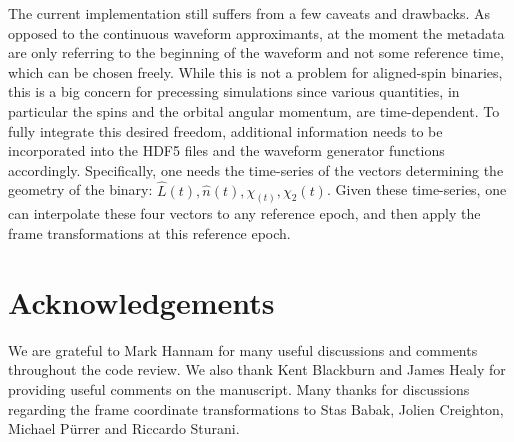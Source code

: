 \documentclass[11pt,tightenlines,article,amssymb,amsmath,amsfonts,superscriptaddress]{revtex4}
\newcommand{\nNR}{\hat{n}}
\newcommand{\lNR}{\hat L}
\begin{document}
The current implementation still suffers from a few caveats and drawbacks. As opposed to the continuous waveform approximants, at the moment the metadata are only referring to the beginning of the waveform and not some reference time, which can be chosen freely. While this is not a problem for aligned-spin binaries, this is a big concern for precessing simulations since various quantities, in particular the spins and the orbital angular momentum, are time-dependent. To fully integrate this desired freedom, additional information needs to be incorporated into the HDF5 files and the waveform generator functions accordingly. Specifically, one needs the time-series of the vectors determining the geometry of the binary: $\lNR(t), \nNR(t), \chi_(t), \chi_2(t)$.  Given these time-series, one can interpolate these four vectors to any reference epoch, and then apply the frame transformations at this reference epoch.

\section*{Acknowledgements}
We are grateful to Mark Hannam for many useful discussions and comments throughout the code review.
We also thank Kent Blackburn and James Healy for providing useful comments on the manuscript.
Many thanks for discussions regarding the frame coordinate transformations to Stas Babak, Jolien Creighton, Michael P\"urrer and Riccardo Sturani.




\end{document}
